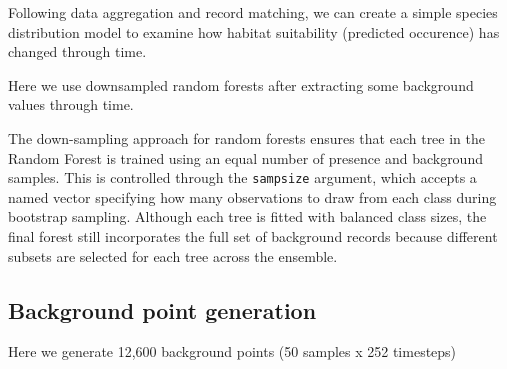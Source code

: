 \documentclass[
]{article}
\begin{document}
Following data aggregation and record matching, we can create a simple
species distribution model to examine how habitat suitability (predicted
occurence) has changed through time.

Here we use downsampled random forests after extracting some background
values through time.

The down-sampling approach for random forests ensures that each tree in
the Random Forest is trained using an equal number of presence and
background samples. This is controlled through the \texttt{sampsize}
argument, which accepts a named vector specifying how many observations
to draw from each class during bootstrap sampling. Although each tree is
fitted with balanced class sizes, the final forest still incorporates
the full set of background records because different subsets are
selected for each tree across the ensemble.

\subsection{Background point
generation}\label{background-point-generation}

Here we generate 12,600 background points (50 samples x 252 timesteps)
\end{document}
